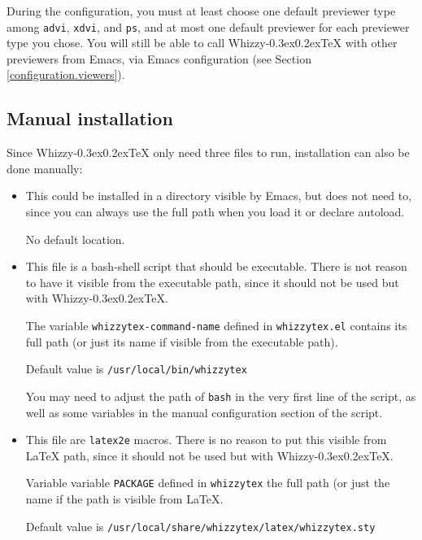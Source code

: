 \documentclass[12pt]{article}
\makeatletter
\let \lst \verb
\def \whizzy {{Whizzy\kern -0.3ex\raise 0.2ex\hbox{\let \@\relax\TeX}}}
\makeatother
\begin{document}
During the configuration, you must at least choose one default previewer
type among \lst"advi", \lst"xdvi", and \lst"ps", and at most one default
previewer for each previewer type you chose. You will still be able to call
{\whizzy} with other previewers from Emacs, via Emacs configuration (see
Section
\ref {configuration.viewers}). 

\subsection {Manual installation}

Since {\whizzy} only need three files to run, installation can also be done
manually:
\begin {itemize}

\item[]\hspace{-2em}{\tt whizzytex.el}

This could be installed in a directory visible by Emacs, but does not need
to, since you can always use the full path when you load it or declare
autoload. 

No default location.

\item[]\hspace {-2em}{\tt whizzytex}

This file is a bash-shell script that should be executable.  There is not
reason to have it visible from the executable path, since it should not be
used but with {\whizzy}.

The variable {\tt whizzytex-command-name} defined in {\tt whizzytex.el} 
contains its full path (or just its name if visible from the executable
path). 

Default value is \lst"/usr/local/bin/whizzytex"

You may  need to adjust the path of \lst"bash" in the very first line of the
script, as well as some variables in the manual configuration section of the
script. 

\item[]\hspace{-2em}{\tt whizzytex.sty}

This file are {\tt latex2e} macros. There is no reason to put this visible
from {\LaTeX} path, since it should not be used but with {\whizzy}.

Variable variable {\tt PACKAGE} defined in {\tt whizzytex} 
the full path (or just the name if the path is visible from {\LaTeX}. 

Default value is \lst"/usr/local/share/whizzytex/latex/whizzytex.sty"

\end {itemize}
\end{document}
